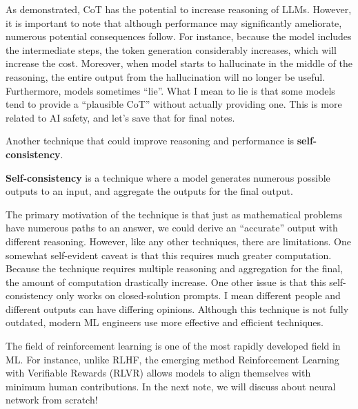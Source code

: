 \documentclass[../../../main.tex]{subfiles}
\begin{document}
As demonstrated, CoT has the potential to increase reasoning
of LLMs. However, it is important to note that although performance
may significantly ameliorate, numerous potential consequences
follow. For instance, because the model includes the intermediate
steps, the token generation considerably increases, which will
increase the cost. Moreover, when model starts to hallucinate
in the middle of the reasoning, the entire output from the
hallucination will no longer be useful. Furthermore, models
sometimes ``lie''. What I mean to lie is that some models tend
to provide a ``plausible CoT'' without actually providing one.
This is more related to AI safety, and let's save that for final
notes.

Another technique that could improve reasoning and performance
is \textbf{self-consistency}.

\begin{definition}{}{}
\textbf{Self-consistency} is a technique where a model generates
numerous possible outputs to an input, and aggregate the outputs
for the final output.
\end{definition}

The primary motivation of the technique is that just as mathematical
problems have numerous paths to an answer, we could derive an
``accurate'' output with different reasoning. However, like any
other techniques, there are limitations. One somewhat self-evident
caveat is that this requires much greater computation. Because the
technique requires multiple reasoning and aggregation for the final,
the amount of computation drastically increase. One other issue is
that this self-consistency only works on closed-solution prompts.
I mean different people and different outputs can have differing
opinions. Although this technique is not fully outdated, modern ML
engineers use more effective and efficient techniques.

The field of reinforcement learning is one of the most rapidly
developed field in ML. For instance, unlike RLHF, the emerging
method Reinforcement Learning with Verifiable Rewards (RLVR)
allows models to align themselves with minimum human contributions.
In the next note, we will discuss about neural network from scratch!
\end{document}
